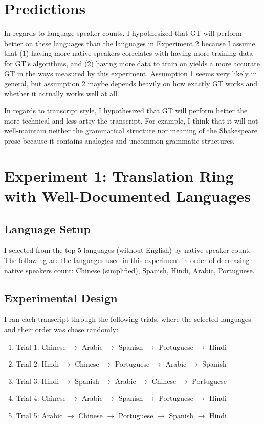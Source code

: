 \documentclass{article}
\begin{document}
\section{Predictions}


In regards to language speaker counts, I hypothesized that GT will perform better on these languages than the languages in Experiment 2 because I assume that (1) having more native speakers correlates with having more training data for GT's algorithms, and (2) having more data to train on yields a more accurate GT in the ways measured by this experiment. Assumption 1 seems very likely in general, but assumption 2 maybe depends heavily on how exactly GT works and whether it actually works well at all.





In regards to transcript style, I hypothesized that GT will perform better the more technical and less artsy the transcript. For example, I think that it will not well-maintain neither the grammatical structure nor meaning of the Shakespeare prose because it contains analogies and uncommon grammatic structures.


\section{Experiment 1: Translation Ring with Well-Documented Languages}\subsection{Language Setup}


I selected from the top 5 languages (without English) by native speaker count.   The following are the languages used in this experiment in order of decreasing native speakers count: Chinese (simplified), Spanish, Hindi, Arabic, Portuguese.




\newpage
\subsection{Experimental Design}


I ran each transcript through the following trials, where the selected languages and their order was chose randomly:
\begin{enumerate}
\item[] Trial 1: Chinese $\rightarrow$ Arabic $\rightarrow$ Spanish $\rightarrow$ Portuguese $\rightarrow$ Hindi
\item[] Trial 2: Hindi $\rightarrow$ Chinese $\rightarrow$ Portuguese $\rightarrow$ Arabic $\rightarrow$ Spanish
\item[] Trial 3: Hindi $\rightarrow$ Spanish $\rightarrow$ Arabic $\rightarrow$ Chinese $\rightarrow$ Portuguese
\item[] Trial 4: Chinese $\rightarrow$ Arabic $\rightarrow$ Spanish $\rightarrow$ Portuguese $\rightarrow$ Hindi
\item[] Trial 5: Arabic $\rightarrow$ Chinese $\rightarrow$ Portuguese $\rightarrow$ Spanish $\rightarrow$ Hindi
\end{enumerate}
\end{document}
